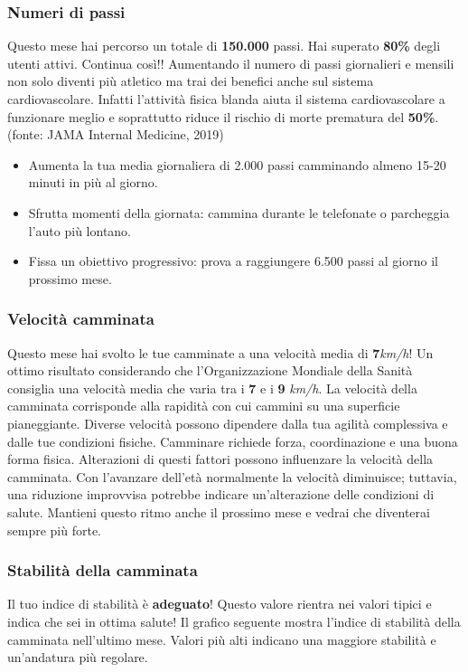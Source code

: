 \documentclass{article}
\begin{document}
\subsubsection{Numeri di passi}
Questo mese hai percorso un totale di \textbf{150.000} passi. Hai superato \textbf{80\%} degli utenti attivi. Continua così!! 
Aumentando il numero di passi giornalieri e mensili non solo diventi più atletico ma trai dei benefici anche sul sistema cardiovascolare. Infatti l'attività fisica blanda aiuta il sistema cardiovascolare a funzionare meglio e soprattutto riduce il rischio di morte prematura del \textbf{50\%}. (fonte: JAMA Internal Medicine, 2019)
\begin{itemize}
    \item Aumenta la tua media giornaliera di 2.000 passi camminando almeno 15-20 minuti in più al giorno.
    \item Sfrutta momenti della giornata: cammina durante le telefonate o parcheggia l’auto più lontano.
    \item Fissa un obiettivo progressivo: prova a raggiungere 6.500 passi al giorno il prossimo mese.
\end{itemize}

\subsubsection{Velocità camminata}
Questo mese hai svolto le tue camminate a una velocità media di \textbf{7}\textit{km/h}! Un ottimo risultato considerando che l'Organizzazione Mondiale della Sanità consiglia una velocità media che varia tra i \textbf{7} e i \textbf{9} \textit{km/h}. La velocità della camminata corrisponde alla rapidità con cui cammini su una superficie pianeggiante. Diverse velocità possono dipendere dalla tua agilità complessiva e dalle tue condizioni fisiche.
Camminare richiede forza, coordinazione e una buona forma fisica. Alterazioni di questi fattori possono influenzare la velocità della camminata. Con l'avanzare dell'età normalmente la velocità diminuisce; tuttavia, una riduzione improvvisa potrebbe indicare un'alterazione delle condizioni di salute.
Mantieni questo ritmo anche il prossimo mese e vedrai che diventerai sempre più forte.

\subsubsection{Stabilità della camminata}
Il tuo indice di stabilità è \textbf{adeguato}!
Questo valore rientra nei valori tipici e indica che sei in ottima salute!
Il grafico seguente mostra l'indice di stabilità della camminata nell'ultimo mese. Valori più alti indicano una maggiore stabilità e un'andatura più regolare.
\end{document}
